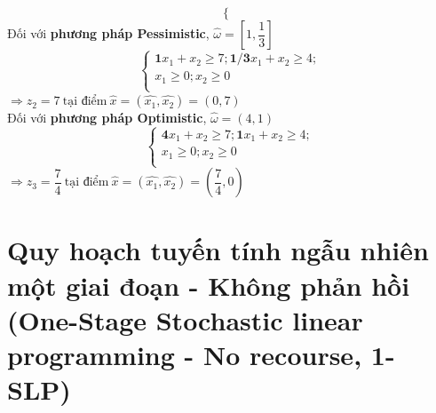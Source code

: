 \documentclass[a4paper]{article}
\begin{document}
\begin{itemize}
\begin{displaymath}
\begin{cases}
                        \end{cases}
                    \end{displaymath}
                Đối với \textbf{phương pháp Pessimistic}, $\hat{\omega}=[1, \dfrac{1}{3}]$
                \begin{displaymath}
                    \begin{cases}
                        \text{$\textbf{1}x_{1}+x_{2} \geq 7; \textbf{1/3}x_{1} + x_{2} \geq 4;$} \\
                        \text{$x_{1} \geq 0; x_{2} \geq 0$} \\
                    \end{cases}
                \end{displaymath}
                $\Longrightarrow z_{2}=7 \: \text{tại điểm} \: \hat{x}=(\hat{x_{1}},\hat{x_{2}})=(0,7)$\\
                Đối với \textbf{phương pháp Optimistic}, $\hat{\omega}=(4,1)$
                \begin{displaymath}
                    \begin{cases}
                        \text{$\textbf{4}x_{1}+x_{2} \geq 7; \textbf{1}x_{1} + x_{2} \geq 4;$} \\
                        \text{$x_{1} \geq 0; x_{2} \geq 0$} \\
                    \end{cases}
                \end{displaymath}
                $\Longrightarrow z_{3}=\dfrac{7}{4} \: \text{tại điểm} \: \hat{x}=(\hat{x_{1}},\hat{x_{2}})=(\dfrac{7}{4},0)$\\
            \end{itemize}

\section{Quy hoạch tuyến tính ngẫu nhiên một giai đoạn - Không phản hồi (One-Stage Stochastic linear programming - No recourse, 1-SLP)}
\end{document}
